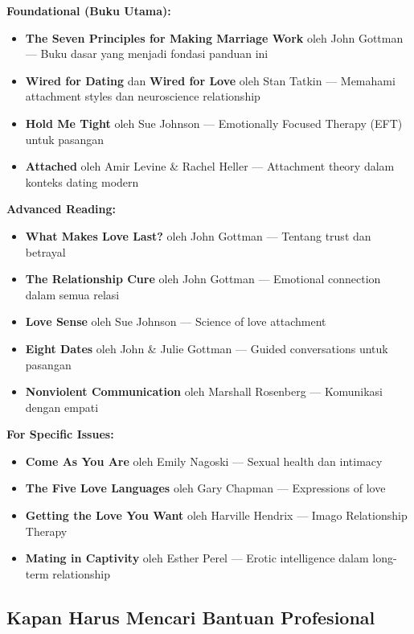 \begin{praktikbox}
\textbf{Foundational (Buku Utama):}
\begin{itemize}[itemsep=0.15cm]
    \item \textbf{The Seven Principles for Making Marriage Work} oleh John Gottman --- Buku dasar yang menjadi fondasi panduan ini
    \item \textbf{Wired for Dating} dan \textbf{Wired for Love} oleh Stan Tatkin --- Memahami attachment styles dan neuroscience relationship
    \item \textbf{Hold Me Tight} oleh Sue Johnson --- Emotionally Focused Therapy (EFT) untuk pasangan
    \item \textbf{Attached} oleh Amir Levine \& Rachel Heller --- Attachment theory dalam konteks dating modern
\end{itemize}

\textbf{Advanced Reading:}
\begin{itemize}[itemsep=0.15cm]
    \item \textbf{What Makes Love Last?} oleh John Gottman --- Tentang trust dan betrayal
    \item \textbf{The Relationship Cure} oleh John Gottman --- Emotional connection dalam semua relasi
    \item \textbf{Love Sense} oleh Sue Johnson --- Science of love attachment
    \item \textbf{Eight Dates} oleh John \& Julie Gottman --- Guided conversations untuk pasangan
    \item \textbf{Nonviolent Communication} oleh Marshall Rosenberg --- Komunikasi dengan empati
\end{itemize}

\textbf{For Specific Issues:}
\begin{itemize}[itemsep=0.15cm]
    \item \textbf{Come As You Are} oleh Emily Nagoski --- Sexual health dan intimacy
    \item \textbf{The Five Love Languages} oleh Gary Chapman --- Expressions of love
    \item \textbf{Getting the Love You Want} oleh Harville Hendrix --- Imago Relationship Therapy
    \item \textbf{Mating in Captivity} oleh Esther Perel --- Erotic intelligence dalam long-term relationship
\end{itemize}
\end{praktikbox}

\subsection{Kapan Harus Mencari Bantuan Profesional}

